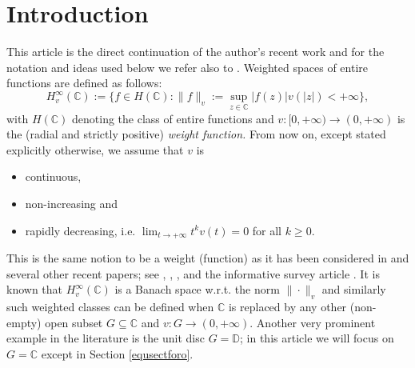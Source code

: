 \documentclass[10pt]{amsart}%
\numberwithin{equation}{section}
\theoremstyle{plain}
\newcommand{\CC}{\mathbb{C}}
\begin{document}
\section{Introduction}\label{Introduction}
This article is the direct continuation of the author's recent work \cite{weightedentirecharacterization} and for the notation and ideas used below we refer also to \cite{weightedentirecharacterization}. Weighted spaces of entire functions are defined as follows:
\begin{equation}\label{weightedclassdef}
H^{\infty}_v(\CC):=\{f\in H(\CC): \|f\|_v:=\sup_{z\in\CC}|f(z)|v(|z|)<+\infty\},
\end{equation}
with $H(\CC)$ denoting the class of entire functions and $v:[0,+\infty)\rightarrow(0,+\infty)$ is the (radial and strictly positive) {\itshape weight function.} From now on, except stated explicitly otherwise, we assume that $v$ is
\begin{itemize}
	\item[$(*)$] continuous,
	
	\item[$(*)$] non-increasing and
	
	\item[$(*)$] rapidly decreasing, i.e. $\lim_{t\rightarrow+\infty}t^kv(t)=0$ for all $k\ge 0$.
\end{itemize}
This is the same notion to be a weight (function) as it has been considered in \cite{weightedentirecharacterization} and several other recent papers; see \cite{BonetTaskinen18}, \cite{BonetLuskyTaskinen19}, \cite{solidassociatedweight}, and the informative survey article \cite{Bonet2022survey}. It is known that $H^{\infty}_v(\CC)$ is a Banach space w.r.t. the norm $\|\cdot\|_v$ and similarly such weighted classes can be defined when $\CC$ is replaced by any other (non-empty) open subset $G\subseteq\CC$ and $v: G\rightarrow(0,+\infty)$. Another very prominent example in the literature is the unit disc $G=\mathbb{D}$; in this article we will focus on $G=\CC$ except in Section \ref{equsectforo}.\vspace{6pt}
\end{document}
